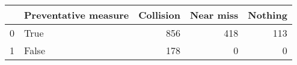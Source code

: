 \begin{tabular}{llrrr}
\toprule
{} &  Preventative measure &  Collision &  Near miss &  Nothing \\
\midrule
0 &                  True &        856 &        418 &      113 \\
1 &                 False &        178 &          0 &        0 \\
\bottomrule
\end{tabular}

